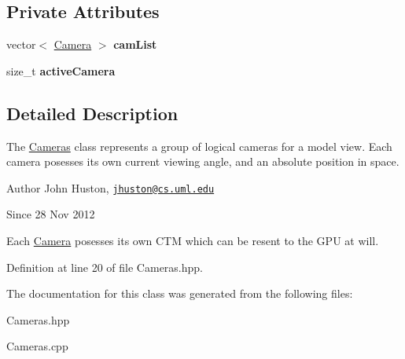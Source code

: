 \subsection*{Private Attributes}
\begin{DoxyCompactItemize}
\item 
\hypertarget{class_cameras_a7411a5eef4362af369217ea8e37cffd3}{vector$<$ \hyperlink{class_camera}{Camera} $>$ {\bfseries cam\-List}}\label{class_cameras_a7411a5eef4362af369217ea8e37cffd3}

\item 
\hypertarget{class_cameras_a3327a3104975b11b6f144ccba0720c49}{size\-\_\-t {\bfseries active\-Camera}}\label{class_cameras_a3327a3104975b11b6f144ccba0720c49}

\end{DoxyCompactItemize}


\subsection{Detailed Description}
The \hyperlink{class_cameras}{Cameras} class represents a group of logical cameras for a model view. Each camera posesses its own current viewing angle, and an absolute position in space. 

\begin{DoxyAuthor}{Author}
John Huston, \href{mailto:jhuston@cs.uml.edu}{\tt jhuston@cs.\-uml.\-edu} 
\end{DoxyAuthor}
\begin{DoxySince}{Since}
28 Nov 2012
\end{DoxySince}
Each \hyperlink{class_camera}{Camera} posesses its own C\-T\-M which can be resent to the G\-P\-U at will. 

Definition at line 20 of file Cameras.\-hpp.



The documentation for this class was generated from the following files\-:\begin{DoxyCompactItemize}
\item 
Cameras.\-hpp\item 
Cameras.\-cpp\end{DoxyCompactItemize}
